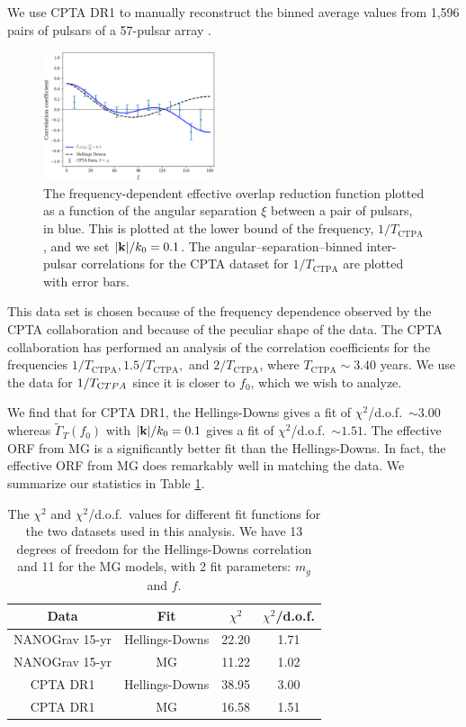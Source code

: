 \documentclass[prd,twocolumn,aps,psfig,nofootinbib,nobibnotes,superscriptaddress,preprintnumbers,times]{revtex4-2}
\begin{document}
We use CPTA DR1 to manually reconstruct the binned average values from 1,596 pairs of pulsars of a 57-pulsar array \cite{Xu:2023wog}. 
\begin{figure}[ht]
    \centering
    \includegraphics[width=0.45\textwidth]{fig3.pdf}
    \caption{The frequency-dependent effective overlap reduction function plotted as a function of the angular separation $\xi$ between a pair of pulsars, in blue. This is plotted at the lower bound of the frequency, $1/T_{\text{CTPA}}$, and we set $|{\bf k}|/k_0 = 0.1$. The angular–separation–binned inter-pulsar correlations for the CPTA dataset for $1/T_{\text{CTPA}}$ are plotted with error bars.}
    \label{fig:cpta}
\end{figure}
This data set is chosen because of the frequency dependence observed by the CPTA collaboration \cite{Xu:2023wog} and because of the peculiar shape of the data. The CPTA collaboration has performed an analysis of the correlation coefficients for the frequencies $1/T_{\text{CTPA}}, 1.5/T_{\text{CTPA}},$ and $2/T_{\text{CTPA}}$, where $T_{\text{CTPA}} \sim 3.40$ years. We use the data for $1/T_{\text CTPA}$ since it is closer to $f_0$, which we wish to analyze. 

We find that for CPTA DR1, the Hellings-Downs gives a fit of $\chi^2$/d.o.f.\ $\sim 3.00$ whereas $\tilde{\Gamma}_T(f_0)$ with $|{\bf k}|/k_0 = 0.1$ gives a fit of $\chi^2$/d.o.f.\ $\sim 1.51$. The effective ORF from MG  is a significantly better fit than the Hellings-Downs. In fact, the effective ORF from MG does remarkably well in matching the data. We summarize our statistics in Table \ref{tbl:chi}.
\begin{table}[ht] 
\centering
\renewcommand{\arraystretch}{1.8}
\begin{tabular}{|c|c|c|c|}
\hline
\textbf{Data} & \textbf{Fit} & \textbf{$\chi^2$} & \textbf{$\chi^2$/d.o.f.} \\
\hline
NANOGrav 15-yr & Hellings-Downs & 22.20 & 1.71 \\
\hline
NANOGrav 15-yr & MG  & 11.22 & 1.02 \\
\hline
CPTA DR1 & Hellings-Downs & 38.95 & 3.00 \\
\hline
CPTA DR1 & MG  & 16.58 & 1.51 \\
\hline
\end{tabular}
\caption{The $\chi^2$ and $\chi^2$/d.o.f.\ values for different fit functions for the two datasets used in this analysis. We have 13 degrees of freedom for the Hellings-Downs correlation and 11 for the MG  models, with 2 fit parameters: $m_g$ and $f$. }
\label{tbl:chi}
\end{table}
\end{document}
